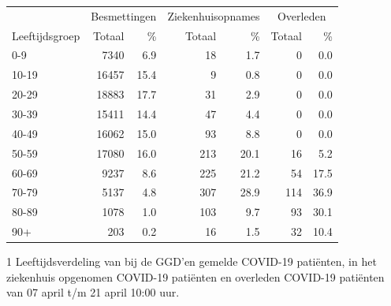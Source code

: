 \documentclass[
  english,
  man,floatsintext]{apa6}
\begin{document}
\begin{table}
\centering\begingroup\fontsize{11}{13}\selectfont

\begin{threeparttable}
\begin{tabular}{lrrrrrr}
\toprule
\multicolumn{1}{c}{ } & \multicolumn{2}{c}{Besmettingen} & \multicolumn{2}{c}{Ziekenhuisopnames} & \multicolumn{2}{c}{Overleden} \\
\cmidrule(l{3pt}r{3pt}){2-3} \cmidrule(l{3pt}r{3pt}){4-5} \cmidrule(l{3pt}r{3pt}){6-7}
Leeftijdsgroep & Totaal & \% & Totaal & \% & Totaal & \%\\
\midrule
0-9 & 7340 & 6.9 & 18 & 1.7 & 0 & 0.0\\
10-19 & 16457 & 15.4 & 9 & 0.8 & 0 & 0.0\\
20-29 & 18883 & 17.7 & 31 & 2.9 & 0 & 0.0\\
30-39 & 15411 & 14.4 & 47 & 4.4 & 0 & 0.0\\
40-49 & 16062 & 15.0 & 93 & 8.8 & 0 & 0.0\\
50-59 & 17080 & 16.0 & 213 & 20.1 & 16 & 5.2\\
60-69 & 9237 & 8.6 & 225 & 21.2 & 54 & 17.5\\
70-79 & 5137 & 4.8 & 307 & 28.9 & 114 & 36.9\\
80-89 & 1078 & 1.0 & 103 & 9.7 & 93 & 30.1\\
90+ & 203 & 0.2 & 16 & 1.5 & 32 & 10.4\\
\bottomrule
\end{tabular}
\begin{tablenotes}
\item[1] Leeftijdsverdeling van bij de GGD’en gemelde COVID-19 patiënten, in het ziekenhuis opgenomen COVID-19 patiënten en overleden COVID-19 patiënten van 07 april t/m 21 april 10:00 uur.
\end{tablenotes}
\end{threeparttable}
\endgroup{}
\end{table}

\newpage
\end{document}
